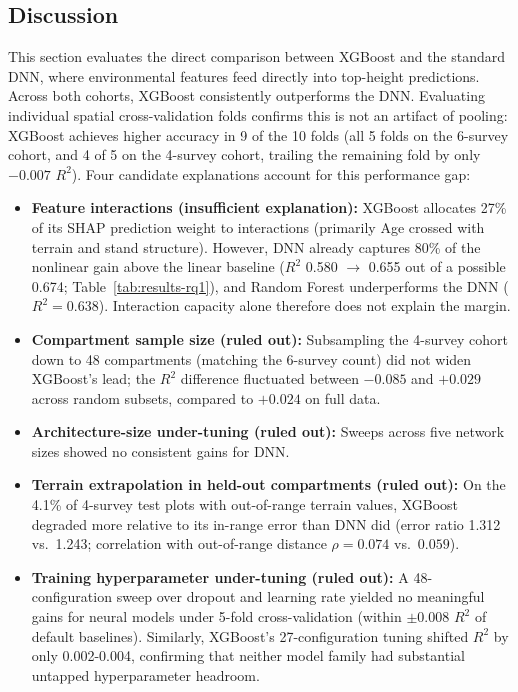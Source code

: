 \documentclass[logo,msc,ai]{infthesis}           %
\begin{document}
\subsection{Discussion}
This section evaluates the direct comparison between XGBoost and the standard DNN, where environmental features feed directly into top-height predictions. Across both cohorts, XGBoost consistently outperforms the DNN. Evaluating individual spatial cross-validation folds confirms this is not an artifact of pooling: XGBoost achieves higher accuracy in 9 of the 10 folds (all 5 folds on the 6-survey cohort, and 4 of 5 on the 4-survey cohort, trailing the remaining fold by only $-0.007$ $R^2$). Four candidate explanations account for this performance gap:

\begin{itemize}
\item \textbf{Feature interactions (insufficient explanation):} XGBoost allocates 27\% of its SHAP prediction weight to interactions (primarily Age crossed with terrain and stand structure). However, DNN already captures 80\% of the nonlinear gain above the linear baseline ($R^2$ 0.580 $\to$ 0.655 out of a possible 0.674; Table~\ref{tab:results-rq1}), and Random Forest underperforms the DNN ($R^2 = 0.638$). Interaction capacity alone therefore does not explain the margin.
\item \textbf{Compartment sample size (ruled out):} Subsampling the 4-survey cohort down to 48 compartments (matching the 6-survey count) did not widen XGBoost's lead; the $R^2$ difference fluctuated between $-0.085$ and $+0.029$ across random subsets, compared to $+0.024$ on full data.
\item \textbf{Architecture-size under-tuning (ruled out):} Sweeps across five network sizes showed no consistent gains for DNN.
\item \textbf{Terrain extrapolation in held-out compartments (ruled out):} On the 4.1\% of 4-survey test plots with out-of-range terrain values, XGBoost degraded more relative to its in-range error than DNN did (error ratio 1.312 vs.\ 1.243; correlation with out-of-range distance $\rho=0.074$ vs.\ $0.059$).
\item \textbf{Training hyperparameter under-tuning (ruled out):} A 48-configuration sweep over dropout and learning rate yielded no meaningful gains for neural models under 5-fold cross-validation (within $\pm0.008$ $R^2$ of default baselines). Similarly, XGBoost's 27-configuration tuning shifted $R^2$ by only 0.002-0.004, confirming that neither model family had substantial untapped hyperparameter headroom.
\end{itemize}
\end{document}
